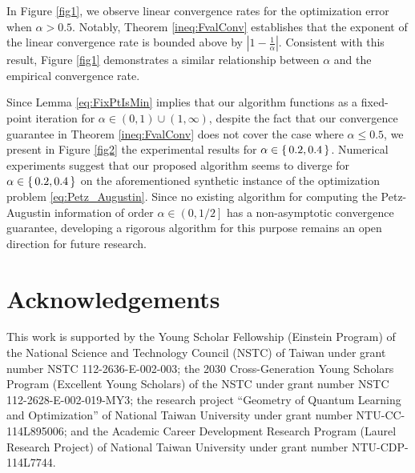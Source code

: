 \documentclass{article}
\begin{document}
In Figure \ref{fig1}, we observe linear convergence rates for the optimization error when $\alpha>0.5$.
Notably, Theorem \ref{ineq:FvalConv} establishes that the exponent of the linear convergence rate is bounded above by $\left|1 - \frac{1}{\alpha}\right|$.
Consistent with this result, Figure \ref{fig1} demonstrates a similar relationship between $\alpha$ and the
empirical 
convergence rate.

Since Lemma \ref{eq:FixPtIsMin} implies that our algorithm functions as a fixed-point iteration for $\alpha \in (0, 1)\cup(1,\infty)$, despite the fact that our convergence guarantee in Theorem \ref{ineq:FvalConv} does not cover the case where $\alpha \leq 0.5$, we present in Figure \ref{fig2} the experimental results for $\alpha \in \set{0.2, 0.4}$. 
Numerical experiments suggest that our proposed algorithm seems to diverge for $\alpha\in\set{0.2,0.4}$ on the aforementioned synthetic instance of the optimization problem \eqref{eq:Petz_Augustin}.
Since no existing algorithm for computing the Petz-Augustin information of order $\alpha\in\left(0,1/2\right]$ has a non-asymptotic convergence guarantee, developing a rigorous algorithm for this purpose remains an open direction for future research.

\section{Acknowledgements}

This work is supported by the Young Scholar Fellowship (Einstein Program) of the National Science and Technology Council (NSTC) of Taiwan under grant number NSTC 112-2636-E-002-003; the 2030 Cross-Generation Young Scholars Program (Excellent Young Scholars) of the NSTC under grant number NSTC 112-2628-E-002-019-MY3; the research project “Geometry of Quantum Learning and Optimization” of National Taiwan University under grant number NTU-CC-114L895006; and the Academic Career Development Research Program (Laurel Research Project) of National Taiwan University under grant number NTU-CDP-114L7744.

%

%

\end{document}
